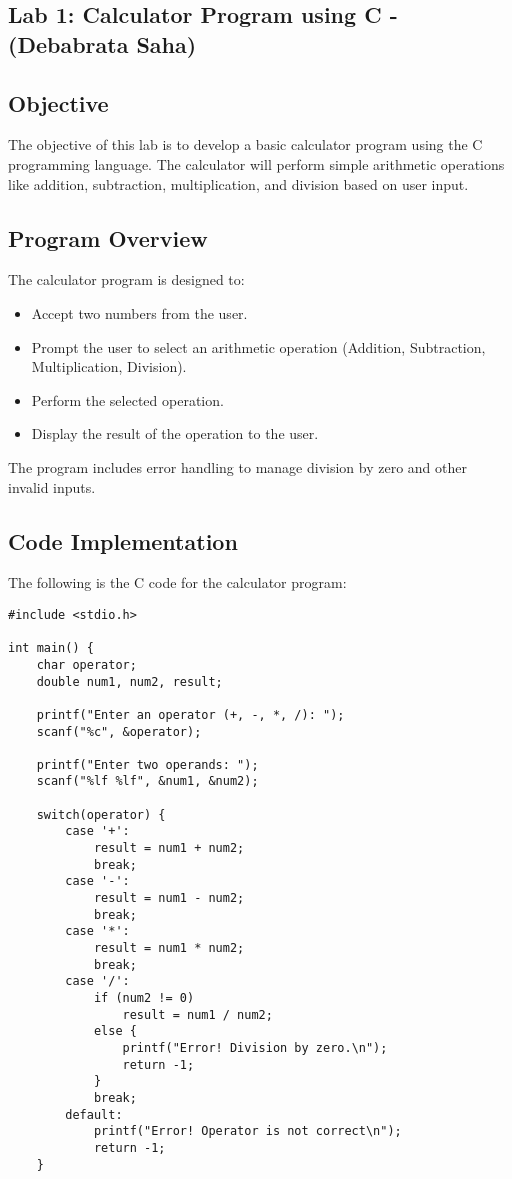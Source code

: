 \documentclass[a4paper,15pt]{article}
\begin{document}
\begin{itemize}[leftmargin=1.5cm]
\vspace{1cm}

\newpage

\section{Lab 1: Calculator Program using C - (Debabrata Saha)}

\subsection{Objective}
The objective of this lab is to develop a basic calculator program using the C programming language. The calculator will perform simple arithmetic operations like addition, subtraction, multiplication, and division based on user input.

\subsection{Program Overview}
The calculator program is designed to:
\begin{itemize}
    \item Accept two numbers from the user.
    \item Prompt the user to select an arithmetic operation (Addition, Subtraction, Multiplication, Division).
    \item Perform the selected operation.
    \item Display the result of the operation to the user.
\end{itemize}

The program includes error handling to manage division by zero and other invalid inputs.

\subsection{Code Implementation}
The following is the C code for the calculator program:

\begin{verbatim}
#include <stdio.h>

int main() {
    char operator;
    double num1, num2, result;

    printf("Enter an operator (+, -, *, /): ");
    scanf("%c", &operator);

    printf("Enter two operands: ");
    scanf("%lf %lf", &num1, &num2);

    switch(operator) {
        case '+':
            result = num1 + num2;
            break;
        case '-':
            result = num1 - num2;
            break;
        case '*':
            result = num1 * num2;
            break;
        case '/':
            if (num2 != 0)
                result = num1 / num2;
            else {
                printf("Error! Division by zero.\n");
                return -1;
            }
            break;
        default:
            printf("Error! Operator is not correct\n");
            return -1;
    }


\end{verbatim}
\end{itemize}
\end{document}
